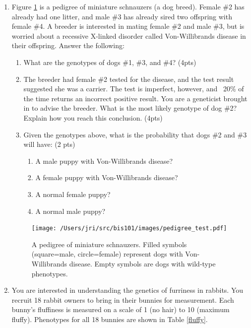 \documentclass[]{article}
\begin{document}
\begin{enumerate}
\item Figure \ref{dogigree} is a pedigree of miniature schnauzers (a dog breed). Female \#2 has already had one litter, and male \#3 has already sired two offspring with female \#4. A breeder is interested in mating female \#2 and male \#3, but is worried about a recessive X-linked disorder called Von-Willibrands disease in their offspring. Answer the following:

\begin{enumerate}
\item What are the genotypes of dogs \#1, \#3, and \#4? (4pts)
\item The breeder had female \#2 tested for the disease, and the test result suggested she was a carrier. The test is imperfect, however, and ~20\% of the time returns an incorrect positive result. You are a geneticist brought in to advise the breeder. What is the most likely genotype of dog \#2? Explain how you reach this conclusion. (4pts)
\item Given the genotypes above, what is the probability that dogs \#2 and \#3 will have: (2 pts)
\begin{enumerate}
\item A male puppy with Von-Willibrands disease?
\item A female puppy with Von-Willibrands disease?
\item A normal female puppy?
\item A normal male puppy?
\end{enumerate}
\end{enumerate}

\begin{figure}[h]
  \begin{center}
   \texttt{[image: /Users/jri/src/bis101/images/pedigree\_test.pdf]}
\caption{A pedigree of miniature schnauzers. Filled symbols (square=male, circle=female) represent dogs with Von-Willibrands disease. Empty symbols are dogs with wild-type phenotypes.}
\label{dogigree}
  \end{center}
\end{figure}

\newpage

\item You are interested in understanding the genetics of furriness in rabbits. You recruit 18 rabbit owners to bring in their bunnies for measurement.  Each bunny's fluffiness is measured on a scale of 1 (no hair) to 10 (maximum fluffy). Phenotypes for all 18 bunnies are shown in Table \ref{fluffy}. 


\end{enumerate}
\end{document}
